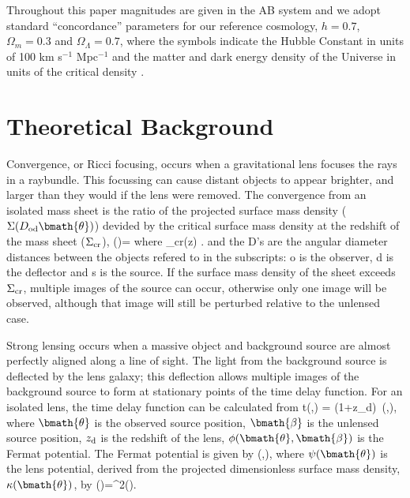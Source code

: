 \documentclass[useAMS,usenatbib]{mn2e}
\begin{document}
Throughout this paper magnitudes are given in the AB system \citep{Oke74} and
we adopt standard ``concordance'' parameters for our reference cosmology, \ie
$h=0.7$, $\Omega_m=0.3$ and $\Omega_\Lambda=0.7$, where the symbols indicate
the Hubble Constant in units of 100 km s$^{-1}$ Mpc$^{-1}$ and the matter and
dark energy density of the Universe in units of the critical density
\citep[e.g.\ ][]{Kom++09}.



\section{Theoretical Background}
\label{sec:theory}



Convergence, or Ricci focusing, occurs when a gravitational lens focuses the rays in a raybundle.
This focussing can cause distant objects to appear brighter, and larger than they would if the lens
 were removed.
The convergence from an isolated mass sheet is the ratio of the projected surface mass density
($\Sigma(D_{\mathrm{od}}\bmath{\theta})$) devided by the critical surface mass density at the redshift of the mass sheet ($\Sigma_{\rm cr}$),
\be
\kappa(\bmath{\theta})= 
\ee
where 
\be \label{eq:sigcrit} 
\Sigma_{\rm cr}(z) \equiv {}.
\ee
and the D's are the angular diameter distances between the objects refered to in the subscripts: o is the observer, d is the deflector and s is the source. If the surface mass density of the sheet exceeds $\Sigma_{\rm cr}$, multiple images of the source can
occur, otherwise only one image will be observed, although that image will still be perturbed
relative to the unlensed case.

Strong lensing occurs when a massive object and background source are almost perfectly
aligned along a line of sight. The light from the background source is deflected by the
lens galaxy; this deflection allows multiple images of the background source to form
at stationary points of the time delay function. For an isolated lens, the time delay
function can be calculated from
\be \label{eq:T} 
\Delta t(\bmath{\theta},\bmath{\beta}) =   (1+z_{\rm d})\, \phi(\bmath{\theta},\bmath{\beta}),
\ee
where $\bmath{\theta}$ is the observed source position, $\bmath{\beta}$ is the 
unlensed source position, $z_{\rm d}$ is the redshift of the lens, $\phi(\bmath{\theta},\bmath{\beta})$ is
the Fermat potential. The Fermat potential is given by
\be \label{eq:FP}
\phi(\bmath{\theta},\bmath{\beta})\equiv {}, 
\ee
where $\psi(\bmath{\theta})$ is the lens potential, derived from the projected dimensionless
surface mass density, $\kappa(\bmath{\theta})$, by 
\be \label{eq:psikappa}
\kappa(\bmath{\theta})=\nabla^2\psi(\bmath{\theta}).
\ee
\end{document}
